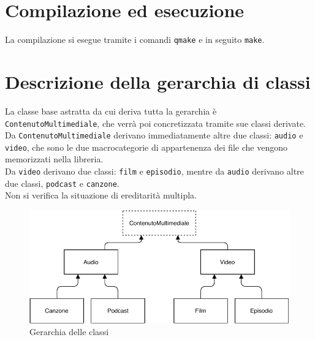 \documentclass[a4paper,10pt]{article}
\begin{document}
\section{Compilazione ed esecuzione}
La compilazione si esegue tramite i comandi \texttt{qmake} e in seguito \texttt{make}. 

\section{Descrizione della gerarchia di classi}

La classe base astratta da cui deriva tutta la gerarchia è \texttt{ContenutoMultimediale}, che verrà poi concretizzata tramite sue classi derivate.
Da \texttt{ContenutoMultimediale} derivano immediatamente altre due classi: \texttt{audio} e \texttt{video}, che sono le due macrocategorie di appartenenza dei file che vengono memorizzati nella libreria. \\
Da \texttt{video} derivano due classi: \texttt{film} e \texttt{episodio}, mentre da \texttt{audio} derivano altre due classi, \texttt{podcast} e \texttt{canzone}. \\
Non si verifica la situazione di ereditarità multipla. \\
\begin{figure}[H]
	\begin{center}
		\includegraphics[width=\textwidth,keepaspectratio]{immagini/classi.pdf}
	\end{center}
	\caption{\label{fig:my-label} Gerarchia delle classi}
\end{figure}
\end{document}
